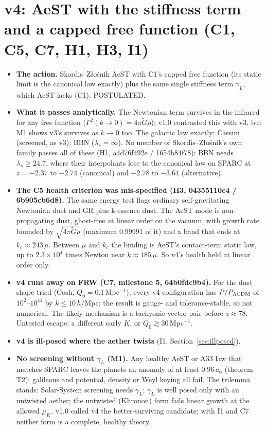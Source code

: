 \documentclass[10pt]{article}
\begin{document}
\section{v4: AeST with the stiffness term and a capped free function (C1, C5, C7, H1, H3, I1)}\label{sec:v4}
\begin{itemize}
\item \textbf{The action.} Skordis--Z{\l}o{\'s}nik AeST with C1's capped free function (its static limit is the canonical law exactly) plus the same single stiffness term $\gamma_L$, which AeST lacks (C1). POSTULATED.
\item \textbf{What it passes analytically.} The Newtonian term survives in the infrared for any free function ($\Gamma^2(k\to0)=4\pi\tilde G\bar\rho$); v1.0 contrasted this with v3, but M1 shows v3's survives as $k\to0$ too. The galactic law exactly; Cassini (screened, as v3); BBN ($\lambda_s=\infty$). No member of Skordis--Z{\l}o{\'s}nik's own family passes all of these (H1, a4d76f492e / 1654b84f78): BBN needs $\lambda_s\ge24.7$, where their interpolants lose to the canonical law on SPARC at $z=-2.37$ to $-2.74$ (canonical) and $-2.78$ to $-3.64$ (alternative).
\item \textbf{The C5 health criterion was mis-specified (H3, 04355110c4 / 6b905cb6d8).} The same energy test flags ordinary self-gravitating Newtonian dust and GR plus k-essence dust. The AeST mode is non-propagating dust, ghost-free at linear order on the vacuum, with growth rate bounded by $\sqrt{4\pi\tilde G\bar\rho}$ (maximum 0.99991 of it) and a band that ends at $k_c\approx243\,\mu$. Between $\mu$ and $k_c$ the binding is AeST's contact-term static law, up to $2.3\times10^{4}$ times Newton near $k\approx185\,\mu$. So v4's health held at linear order only.
\item \textbf{v4 runs away on FRW (C7, milestone 5, 64b0fdc9b4).} For the dust shape tried (Cosh, $Q_0=0.1$\,Mpc$^{-1}$), every v4 configuration has $P/P_{\Lambda\rm CDM}$ of $10^{2}$--$10^{41}$ by $k\le10\,h$/Mpc; the result is gauge- and tolerance-stable, so not numerical. The likely mechanism is a tachyonic vector pair before $z\approx78$. Untested escape: a different early $K$, or $Q_0\gtrsim30$\,Mpc$^{-1}$.
\item \textbf{v4 is ill-posed where the aether twists} (I1, Section~\ref{sec:illposed}).
\item \textbf{No screening without $\gamma_L$ (M1).} Any healthy AeST or A33 law that matches SPARC leaves the planets an anomaly of at least $0.96\,a_0$ (theorem T2); galileons and potential, density or Weyl keying all fail. The trilemma stands: Solar-System screening needs $\gamma_L$; $\gamma_L$ is well posed only with an untwisted aether; the untwisted (Khronon) form fails linear growth at the allowed $\mu_K$. v1.0 called v4 the better-surviving candidate; with I1 and C7 neither form is a complete, healthy theory.
\end{itemize}
\end{document}
